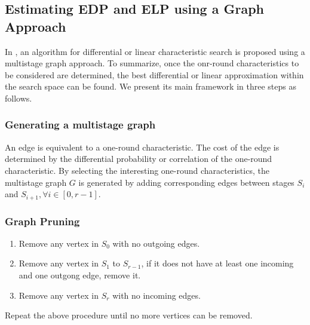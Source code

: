 \subsection{Estimating EDP and ELP using a Graph Approach}

In \cite{EPRINT:HalVej18}, an algorithm for differential or linear characteristic search is proposed using a multistage graph approach. To summarize, once the onr-round characteristics to be considered are determined, the best differential or linear approximation within the search space can be found. We present its main framework in three steps as follows.

\subsubsection{Generating a multistage graph}
An edge is equivalent to a one-round characteristic. The cost of the edge is determined by the differential probability or correlation of the one-round characteristic. By selecting the interesting one-round characteristics, the multistage graph $G$ is generated by adding corresponding edges between stages $S_i$ and $S_{i+1}, \forall i\in[0,r-1]$. 

\subsubsection{Graph Pruning}
\begin{enumerate}
    \item Remove any vertex in $S_0$ with no outgoing edges.
    \item Remove any vertex in $S_1$ to $S_{r-1}$, if it does not have at least one incoming and one outgong edge, remove it.
    \item Remove any vertex in $S_r$ with no incoming edges.
\end{enumerate}
Repeat the above procedure until no more vertices can be removed. 

